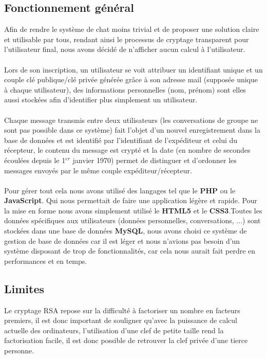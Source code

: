 \documentclass[12pt,a4paper]{report}
\begin{document}
\subsection{Fonctionnement général}
Afin de rendre le système de chat moins trivial et de proposer une solution claire et utilisable par tous, rendant ainsi le processus de cryptage transparent pour l'utilisateur final, nous avons décidé de n'afficher aucun calcul à l'utilisateur.

\paragraph{}

Lors de son inscription, un utilisateur se voit attribuer un identifiant unique et un couple clé publique/clé privée générée grâce à son adresse mail (supposée unique à chaque utilisateur), des informations personnelles (nom, prénom) 
sont elles aussi stockées afin d'identifier plus simplement un utilisateur.

\paragraph{}

Chaque message transmis entre deux utilisateurs (les conversations de groupe ne sont pas possible dans ce système) fait l'objet d'un nouvel enregistrement dans la base de données et est identifié par l'identifiant de l'expéditeur et celui du récepteur, le contenu du message est crypté et la date (en nombre de secondes écoulées depuis le 1$^{er}$ janvier 1970) permet de distinguer et d'ordonner les messages envoyés par le même couple expéditeur/récepteur.
\paragraph{}

Pour gérer tout cela nous avons utilisé des langages tel que le \textbf{PHP} ou le \textbf{JavaScript}. Qui nous permettait de faire une application légère et rapide. Pour la mise en forme nous avons simplement utilisé le \textbf{HTML5} et le \textbf{CSS3}.Toutes les données spécifiques aux utilisateurs (données personnelles, conversations, ...) sont stockées dans une base de données \textbf{MySQL}, nous avons choisi ce système de gestion de base de données car il est léger et nous n'avions pas besoin d'un système disposant de trop de fonctionnalités, car cela nous aurait fait perdre en performances et en temps.

\subsection{Limites}
Le cryptage RSA repose sur la difficulté à factoriser un nombre en facteurs premiers, il est donc important de souligner qu'avec la puissance de calcul actuelle des ordinateurs, l'utilisation d'une clef de petite taille rend la factorisation facile, il est donc possible de retrouver la clef privée d'une tierce personne.
\end{document}
